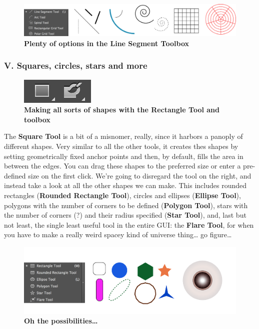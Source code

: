 \documentclass[]{article}
\begin{document}
\begin{figure}
\centering
\includegraphics{LinesBox.png}
\caption{\textbf{Plenty of options in the Line Segment Toolbox}}
\end{figure}

\subsubsection{V. Squares, circles, stars and
more}\label{v.-squares-circles-stars-and-more}

\begin{figure}
\centering
\includegraphics{Squaretool.png}
\caption{\textbf{Making all sorts of shapes with the Rectangle Tool and
toolbox}}
\end{figure}

The \textbf{Square Tool} is a bit of a misnomer, really, since it
harbors a panoply of different shapes. Very similar to all the other
tools, it creates thes shapes by setting geometrically fixed anchor
points and then, by default, fills the area in between the edges. You
can drag these shapes to the preferred size or enter a pre-defined size
on the first click. We're going to disregard the tool on the right, and
instead take a look at all the other shapes we can make. This includes
rounded rectangles (\textbf{Rounded Rectangle Tool}), circles and
ellipses (\textbf{Ellipse Tool}), polygons with the number of corners to
be defined (\textbf{Polygon Tool}), stars with the number of corners (?)
and their radius specified (\textbf{Star Tool}), and, last but not
least, the single least useful tool in the entire GUI: the \textbf{Flare
Tool}, for when you have to make a really weird spacey kind of universe
thing\ldots{} go figure\ldots{}

\begin{figure}
\centering
\includegraphics{Shapes.png}
\caption{\textbf{Oh the possibilities\ldots{}}}
\end{figure}
\end{document}
